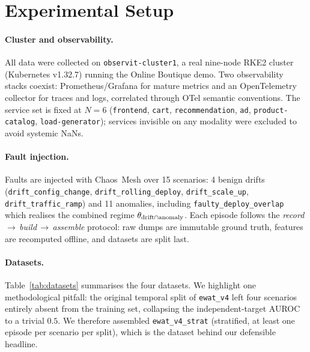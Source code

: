 \section{Experimental Setup}
\label{sec:setup}

\paragraph{Cluster and observability.}
All data were collected on \texttt{observit-cluster1}, a real nine-node RKE2 cluster (Kubernetes
v1.32.7) running the Online Boutique demo. Two observability stacks coexist: Prometheus/Grafana
for mature metrics and an OpenTelemetry collector for traces and logs, correlated through OTel
semantic conventions. The service set is fixed at $N=6$ (\texttt{frontend}, \texttt{cart},
\texttt{recommendation}, \texttt{ad}, \texttt{product-catalog}, \texttt{load-generator}); services
invisible on any modality were excluded to avoid systemic NaNs.

\paragraph{Fault injection.}
Faults are injected with Chaos~Mesh over 15 scenarios: 4 benign drifts
(\texttt{drift\_config\_change}, \texttt{drift\_rolling\_deploy}, \texttt{drift\_scale\_up},
\texttt{drift\_traffic\_ramp}) and 11 anomalies, including \texttt{faulty\_deploy\_overlap} which
realises the combined regime $\theta_{\text{drift}\cap\text{anomaly}}$. Each episode follows the
\emph{record\,$\to$\,build\,$\to$\,assemble} protocol: raw dumps are immutable ground truth,
features are recomputed offline, and datasets are split last.

\paragraph{Datasets.}
Table~\ref{tab:datasets} summarises the four datasets. We highlight one methodological pitfall:
the original temporal split of \texttt{ewat\_v4} left four scenarios entirely absent from the
training set, collapsing the independent-target AUROC to a trivial $0.5$. We therefore assembled
\texttt{ewat\_v4\_strat} (stratified, at least one episode per scenario per split), which is the
dataset behind our defensible headline.

